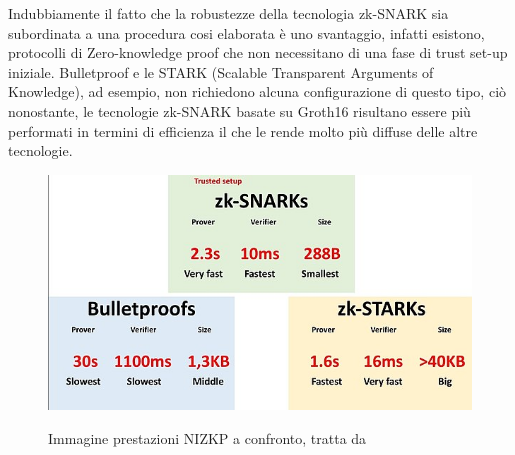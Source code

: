 Indubbiamente il fatto che la robustezze della tecnologia zk-SNARK sia subordinata a una procedura cosi elaborata è uno
svantaggio, infatti esistono, protocolli di Zero-knowledge proof che non necessitano di una fase di trust set-up
iniziale. Bulletproof e le STARK (Scalable Transparent Arguments of Knowledge), ad esempio, non richiedono alcuna
configurazione di questo tipo, ciò nonostante, le tecnologie  zk-SNARK basate su Groth16 risultano essere più performati in termini di
efficienza il che le rende molto più diffuse delle altre tecnologie.
\begin{figure}[H]
    \centering
    \includegraphics[width=13cm]{./chapters/1.state-of-art/images/14.diff_zk.png}
    \label{fig:different_zk}
    \captionsetup{justification=centering}
    \caption{Immagine prestazioni NIZKP a confronto, tratta da \cite{non_interactive_zero_knowledge_proof}}
\end{figure}